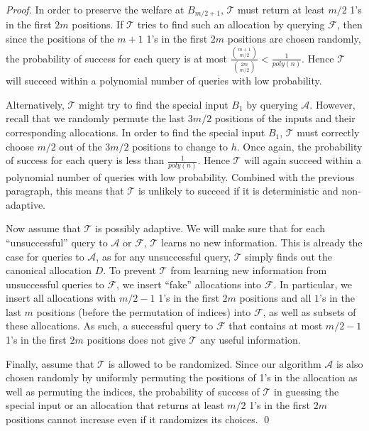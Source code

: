 \documentclass[runningheads,a4paper]{llncs}
\begin{document}
\begin{proof}
In order to preserve the welfare at $B_{m/2+1}$, $\mathcal{T}$ must return at least $m/2$ 1's in the first $2m$ positions. If $\mathcal{T}$ tries to find such an allocation by querying $\mathcal{F}$, then since the positions of the $m+1$ 1's in the first $2m$ positions are chosen randomly, the probability of success for each query is at most $\frac{\binom{m+1}{m/2}}{\binom{2m}{m/2}}<\frac{1}{poly(n)}$. Hence $\mathcal{T}$ will succeed within a polynomial number of queries with low probability. 

Alternatively, $\mathcal{T}$ might try to find the special input $B_1$ by querying $\mathcal{A}$. However, recall that we randomly permute the last $3m/2$ positions of the inputs and their corresponding allocations. In order to find the special input $B_1$, $\mathcal{T}$ must correctly choose $m/2$ out of the $3m/2$ positions to change to $h$. Once again, the probability of success for each query is less than $\frac{1}{poly(n)}$. Hence $\mathcal{T}$ will again succeed within a polynomial number of queries with low probability. Combined with the previous paragraph, this means that $\mathcal{T}$ is unlikely to succeed if it is deterministic and non-adaptive.

Now assume that $\mathcal{T}$ is possibly adaptive. We will make sure that for each ``unsuccessful'' query to $\mathcal{A}$ or $\mathcal{F}$, $\mathcal{T}$ learns no new information. This is already the case for queries to $\mathcal{A}$, as for any unsuccessful query, $\mathcal{T}$ simply finds out the canonical allocation $D$. To prevent $\mathcal{T}$ from learning new information from unsuccessful queries to $\mathcal{F}$, we insert ``fake'' allocations into $\mathcal{F}$. In particular, we insert all allocations with $m/2-1$ 1's in the first $2m$ positions and all $1$'s in the last $m$ positions (before the permutation of indices) into $\mathcal{F}$, as well as subsets of these allocations. As such, a successful query to $\mathcal{F}$ that contains at most $m/2-1$ 1's in the first $2m$ positions does not give $\mathcal{T}$ any useful information.

Finally, assume that $\mathcal{T}$ is allowed to be randomized. Since our algorithm $\mathcal{A}$ is also chosen randomly by uniformly permuting the positions of 1's in the allocation as well as permuting the indices, the probability of success of $\mathcal{T}$ in guessing the special input or an allocation that returns at least $m/2$ 1's in the first $2m$ positions cannot increase even if it randomizes its choices. \qed
\end{proof}
\end{document}
